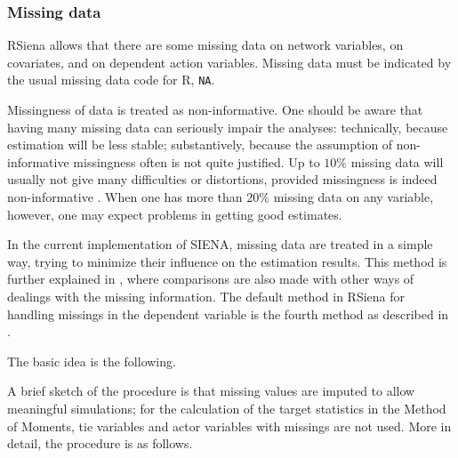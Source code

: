 \documentclass[a4paper,fleqn,11pt]{article}
\newcommand{\+}{\, + \,}
\newcommand{\Rn}{{\sf R}}
\newcommand{\RS}{{\sf \textsf{RSiena} }}
\newcommand{\si}{{\sf SIENA}}
\begin{document}
\subsubsection{Missing data}
\label{S_missing}

\RS allows that there are some missing data on network variables,
on covariates, and on dependent action
variables.  Missing data must be indicated by
the usual missing data code for \Rn, \texttt{NA}.

Missingness of data is treated as non-informative.
One should be aware that having many missing data can seriously
impair the analyses: technically, because estimation will be
less stable; substantively, because the assumption of
non-informative missingness often is not quite justified.
Up to $10\%$ missing data will usually not give many difficulties
or distortions, provided missingness is indeed non-informative
\citep{HuismanSteglich08}.
When one has more than $20\%$ missing data on any variable, however,
one may expect problems in getting good estimates.

In the current implementation of \si, missing data are treated in
a simple way, trying to minimize their influence on the estimation
results.
This method is further explained in \citet{HuismanSteglich08},
where comparisons are also made with other ways of dealings with the missing
information. The default method in \RS for handling missings in the dependent
variable is the fourth method as described in \citet{HuismanSteglich08}.

The basic idea is the following.
\medskip

A brief sketch of the procedure is that
missing values are imputed to allow meaningful simulations;
for the calculation of the target statistics in the Method of Moments,
tie variables and actor variables with missings are not
used.
More in detail, the procedure is as follows.
\end{document}
